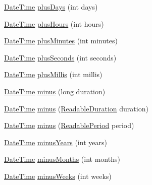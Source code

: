 \begin{DoxyCompactItemize}
\item 
\hyperlink{classorg_1_1joda_1_1time_1_1_date_time}{Date\-Time} \hyperlink{classorg_1_1joda_1_1time_1_1_date_time_a85e100a78f181c6862e0d22d071677a9}{plus\-Days} (int days)
\item 
\hyperlink{classorg_1_1joda_1_1time_1_1_date_time}{Date\-Time} \hyperlink{classorg_1_1joda_1_1time_1_1_date_time_a34fc12f1e3159c0c1d7a87b558f63d85}{plus\-Hours} (int hours)
\item 
\hyperlink{classorg_1_1joda_1_1time_1_1_date_time}{Date\-Time} \hyperlink{classorg_1_1joda_1_1time_1_1_date_time_a62520d4c34f43e9a6d8d3a361baea386}{plus\-Minutes} (int minutes)
\item 
\hyperlink{classorg_1_1joda_1_1time_1_1_date_time}{Date\-Time} \hyperlink{classorg_1_1joda_1_1time_1_1_date_time_ae9a945c8600637b85b708bdc48cc28a4}{plus\-Seconds} (int seconds)
\item 
\hyperlink{classorg_1_1joda_1_1time_1_1_date_time}{Date\-Time} \hyperlink{classorg_1_1joda_1_1time_1_1_date_time_ab3b518025f16892059b845ef7b067e85}{plus\-Millis} (int millis)
\item 
\hyperlink{classorg_1_1joda_1_1time_1_1_date_time}{Date\-Time} \hyperlink{classorg_1_1joda_1_1time_1_1_date_time_a1009ffb27dd753ffbf3201563b31c1ef}{minus} (long duration)
\item 
\hyperlink{classorg_1_1joda_1_1time_1_1_date_time}{Date\-Time} \hyperlink{classorg_1_1joda_1_1time_1_1_date_time_a4b2bff8720d919d251080aea7c3a153b}{minus} (\hyperlink{interfaceorg_1_1joda_1_1time_1_1_readable_duration}{Readable\-Duration} duration)
\item 
\hyperlink{classorg_1_1joda_1_1time_1_1_date_time}{Date\-Time} \hyperlink{classorg_1_1joda_1_1time_1_1_date_time_a49a3611e58f644c341d7e7d9f7be8c7c}{minus} (\hyperlink{interfaceorg_1_1joda_1_1time_1_1_readable_period}{Readable\-Period} period)
\item 
\hyperlink{classorg_1_1joda_1_1time_1_1_date_time}{Date\-Time} \hyperlink{classorg_1_1joda_1_1time_1_1_date_time_a9b709d2960638ee8fbef1c302fe6ea2c}{minus\-Years} (int years)
\item 
\hyperlink{classorg_1_1joda_1_1time_1_1_date_time}{Date\-Time} \hyperlink{classorg_1_1joda_1_1time_1_1_date_time_aca68e56eb884fa3f7f67770056692f58}{minus\-Months} (int months)
\item 
\hyperlink{classorg_1_1joda_1_1time_1_1_date_time}{Date\-Time} \hyperlink{classorg_1_1joda_1_1time_1_1_date_time_ade7d32d7aa8769a217b4ef6998feaeed}{minus\-Weeks} (int weeks)
\item 

\end{DoxyCompactItemize}
